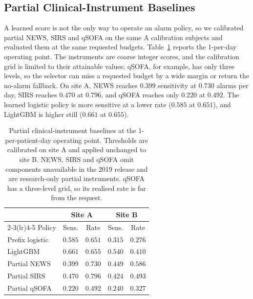\subsection{Partial Clinical-Instrument Baselines}
\label{sec:clinical}

A learned score is not the only way to operate an alarm policy, so we calibrated partial NEWS, SIRS and qSOFA on the same A calibration subjects and evaluated them at the same requested budgets. Table~\ref{tab:clinical} reports the 1-per-day operating point. The instruments are coarse integer scores, and the calibration grid is limited to their attainable values; qSOFA, for example, has only three levels, so the selector can miss a requested budget by a wide margin or return the no-alarm fallback. On site A, NEWS reaches $0.399$ sensitivity at $0.730$ alarms per day, SIRS reaches $0.470$ at $0.796$, and qSOFA reaches only $0.220$ at $0.492$. The learned logistic policy is more sensitive at a lower rate ($0.585$ at $0.651$), and LightGBM is higher still ($0.661$ at $0.655$).

\begin{table}[H]
\centering
\caption{Partial clinical-instrument baselines at the 1-per-patient-day operating point. Thresholds are calibrated on site A and applied unchanged to site B. NEWS, SIRS and qSOFA omit components unavailable in the 2019 release and are research-only partial instruments. qSOFA has a three-level grid, so its realised rate is far from the request.}
\label{tab:clinical}
\small
\begin{tabular}{lcccc}
\toprule
 & \multicolumn{2}{c}{Site A} & \multicolumn{2}{c}{Site B} \\
\cmidrule(lr){2-3}\cmidrule(lr){4-5}
Policy & Sens. & Rate & Sens. & Rate \\
\midrule
Prefix logistic & $0.585$ & $0.651$ & $0.315$ & $0.276$ \\
LightGBM & $0.661$ & $0.655$ & $0.540$ & $0.410$ \\
Partial NEWS & $0.399$ & $0.730$ & $0.449$ & $0.586$ \\
Partial SIRS & $0.470$ & $0.796$ & $0.424$ & $0.493$ \\
Partial qSOFA & $0.220$ & $0.492$ & $0.240$ & $0.327$ \\
\bottomrule
\end{tabular}
\end{table}

